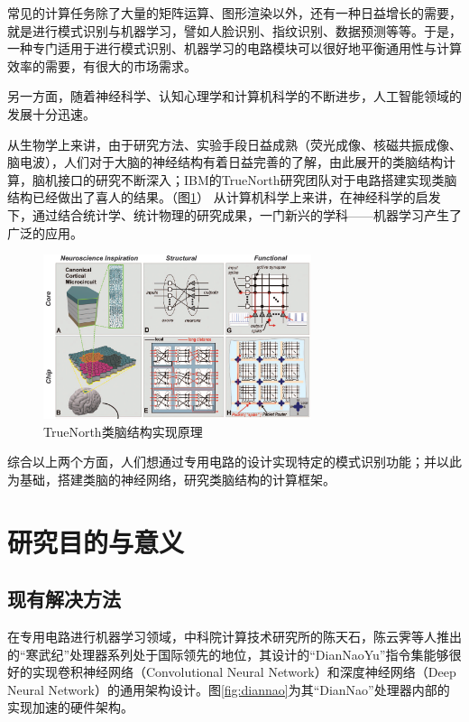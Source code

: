 常见的计算任务除了大量的矩阵运算、图形渲染以外，还有一种日益增长的需要，就是进行模式识别与机器学习，譬如人脸识别、指纹识别、数据预测等等。于是，一种专门适用于进行模式识别、机器学习的电路模块可以很好地平衡通用性与计算效率的需要，有很大的市场需求。

另一方面，随着神经科学、认知心理学和计算机科学的不断进步，人工智能领域的发展十分迅速。

从生物学上来讲，由于研究方法、实验手段日益成熟（荧光成像、核磁共振成像、脑电波），人们对于大脑的神经结构有着日益完善的了解，由此展开的类脑结构计算，脑机接口的研究不断深入；IBM的TrueNorth研究团队\cite{brainchip2014}对于电路搭建实现类脑结构已经做出了喜人的结果。（图\ref{fig:truenorth}）
从计算机科学上来讲，在神经科学的启发下，通过结合统计学、统计物理的研究成果，一门新兴的学科——机器学习产生了广泛的应用。

\begin{figure}[htbp]
   \centering
   \includegraphics[width=0.7\textwidth]{TrueNorth.png} %
   \caption{TrueNorth类脑结构实现原理}
   \label{fig:truenorth}
\end{figure}

综合以上两个方面，人们想通过专用电路的设计实现特定的模式识别功能；并以此为基础，搭建类脑的神经网络，研究类脑结构的计算框架。

\section{研究目的与意义}
\subsection{现有解决方法}
在专用电路进行机器学习领域，中科院计算技术研究所的陈天石，陈云霁等人推出的“寒武纪”处理器系列处于国际领先的地位\cite{Chen2014DianNao}，其设计的“DianNaoYu”指令集能够很好的实现卷积神经网络（Convolutional Neural Network）和深度神经网络（Deep Neural Network）的通用架构设计。图\ref{fig:diannao}为其“DianNao”处理器内部的实现加速的硬件架构。

